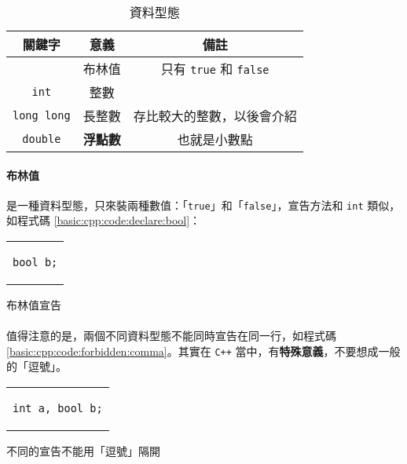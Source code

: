 \documentclass[12pt,a4paper,oneside]{article}
\begin{document}
\begin{CJK}{UTF8}{bkai}
\begin{table}[h!]
\centering
\begin{tabular}{|c|c|c|}
\hline
\textbf{關鍵字} & \textbf{意義} & \textbf{備註}\\
\hline
\hline
\index{資料型態!布林值}{\lstinline!bool!} & 布林值 & 只有 \lstinline!true! 和 \lstinline!false!\\
\hline
\lstinline!int! & 整數 &\\
\hline
\lstinline!long long! & 長整數 & 存比較大的整數，以後會介紹\\
\hline
\lstinline!double!    & \textbf{浮點數} & 也就是小數點\\
\hline
\end{tabular}
\caption{資料型態}
\label{basic:cpp:table:primitive:type}
\end{table}

\paragraph{布林值}是一種資料型態，只來裝兩種數值：「\lstinline!true!」和「\lstinline!false!」，宣告方法和 \lstinline!int! 類似，如程式碼 \ref{basic:cpp:code:declare:bool}：

\begin{code}[h!]
\centering
\begin{tabular}{c}
\begin{lstlisting}
bool b;
\end{lstlisting}
\end{tabular}
\caption{布林值宣告}
\label{basic:cpp:code:declare:bool}
\end{code}

\paragraph{}值得注意的是，兩個不同資料型態不能同時宣告在同一行，如程式碼 \ref{basic:cpp:code:forbidden:comma}。其實在 \texttt{C++} 當中，有\textbf{特殊意義}，不要想成一般的「逗號」。

\begin{code}[h!]
\centering
\begin{tabular}{c}
\begin{lstlisting}
int a, bool b;
\end{lstlisting}
\end{tabular}
\caption{不同的宣告不能用「逗號」隔開}
\label{basic:cpp:code:forbidden:comma}
\end{code}


\end{CJK}
\end{document}
